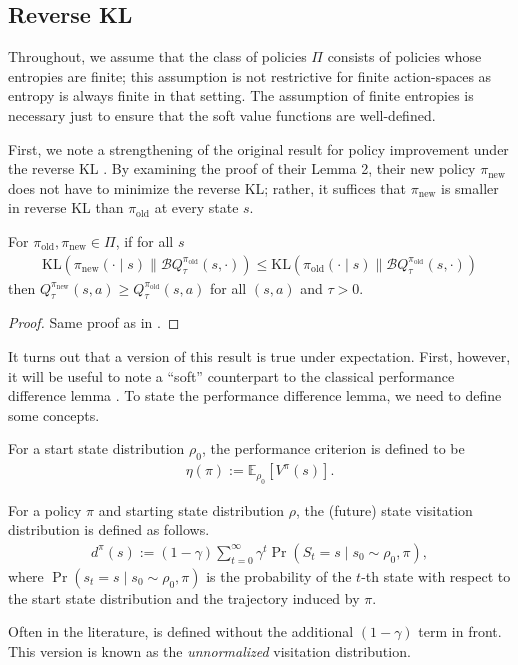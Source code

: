 \documentclass[twoside,11pt]{article}
\newcommand{\Ex}{\mathbb{E}}
\newcommand{\KL}{\mathrm{KL}}
\newcommand{\boltzmannQ}{\mathcal{B}Q}
\newcommand{\pinew}{{\pi_\mathrm{new}}}
\newcommand{\piold}{{\pi_\mathrm{old}}}
\begin{document}
\subsection{Reverse KL}
Throughout, we assume that the class of policies $\Pi$ consists of policies whose entropies are finite; this assumption is not restrictive for finite action-spaces as entropy is always finite in that setting. The assumption of finite entropies is necessary just to ensure that the soft value functions are well-defined. 

First, we note a strengthening of the original result for policy improvement under the reverse KL \citep{haarnoja2018soft}. By examining the proof of their Lemma 2, their new policy $\pi_{\mathrm{new}}$ does not have to minimize the reverse KL; rather, it suffices that $\pi_{\mathrm{new}}$ is smaller in reverse KL than $\pi_{\mathrm{old}}$ at every state $s$. 
\begin{lemma}\label{lem:stronger-sac}
For $\piold, \pinew \in \Pi$, if for all $s$
\begin{align*}
    \KL(\pinew(\cdot \mid s) \parallel \boltzmannQ^\piold_\tau(s, \cdot)) \le \KL(\piold(\cdot \mid s) \parallel \boltzmannQ_\tau^\piold(s, \cdot))\nonumber
\end{align*}
then $Q^\pinew_\tau(s, a) \geq Q^\piold_\tau(s, a)$ for all $(s, a)$ and $\tau > 0$.
\end{lemma}
\begin{proof}
Same proof as in \citet{haarnoja2018soft}.
\end{proof}
It turns out that a version of this result is true under expectation. First, however, it will be useful to note a ``soft'' counterpart to the classical performance difference lemma \citep{kakade2002approximately}. To state the performance difference lemma, we need to define some concepts. 
\begin{definition}\label{def:perf-criterion}
For a start state distribution $\rho_0$, the performance criterion is defined to be
\begin{align*}
    \eta(\pi) := \Ex_{\rho_0}[V^\pi(s)].
\end{align*}
\end{definition}

\begin{definition}\label{def:d_pi}
For a policy $\pi$ and starting state distribution $\rho$, the (future) state visitation distribution is defined as follows.
\begin{align*}
    d^\pi(s) := (1 - \gamma) \sum_{t = 0}^\infty \gamma^t \Pr(S_t = s \mid s_0 \sim \rho_0, \pi),
\end{align*}
where $\Pr(s_t = s \mid s_0 \sim \rho_0, \pi)$ is the probability of the $t$-th state with respect to the start state distribution and the trajectory induced by $\pi$. 
\end{definition}
Often in the literature,  is defined without the additional $(1 - \gamma)$ term in front. This version is known as the \textit{unnormalized} visitation distribution.
\end{document}
